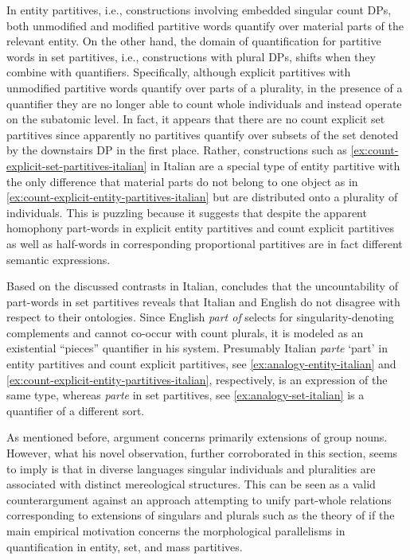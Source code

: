 In entity partitives, i.e., constructions involving embedded singular count DPs, both unmodified and modified partitive words quantify over material parts of the relevant entity. On the other hand, the domain of quantification for partitive words in set partitives, i.e., constructions with plural DPs, shifts when they combine with quantifiers. Specifically, although explicit partitives with unmodified partitive words quantify over parts of a plurality, in the presence of a quantifier they are no longer able to count whole individuals and instead operate on the subatomic level. In fact, it appears that there are no count explicit set partitives since apparently no partitives quantify over subsets of the set denoted by the downstairs DP in the first place. Rather, constructions such as \ref{ex:count-explicit-set-partitives-italian} in Italian are a special type of entity partitive with the only difference that material parts do not belong to one object as in \ref{ex:count-explicit-entity-partitives-italian} but are distributed onto a plurality of individuals. This is puzzling because it suggests that despite the apparent homophony part-words in explicit entity partitives and count explicit partitives as well as half-words in corresponding proportional partitives are in fact different semantic expressions.

Based on the discussed contrasts in Italian, \citet{schwarzschild1996pluralities} concludes that the uncountability of part-words in set partitives reveals that Italian and English do not disagree with respect to their ontologies. Since English \textit{part of} selects for singularity-denoting complements and cannot co-occur with count plurals, it is modeled as an existential ``pieces'' quantifier in his system. Presumably Italian \textit{parte} `part' in entity partitives and count explicit partitives, see \ref{ex:analogy-entity-italian} and \ref{ex:count-explicit-entity-partitives-italian}, respectively, is an expression of the same type, whereas \textit{parte} in set partitives, see \ref{ex:analogy-set-italian} is a quantifier of a different sort.

As mentioned before,  argument concerns primarily extensions of group nouns. However, what his novel observation, further corroborated in this section, seems to imply is that in diverse languages singular individuals and pluralities are associated with distinct mereological structures. This can be seen as a valid counterargument against an approach attempting to unify part-whole relations corresponding to extensions of singulars and plurals such as the theory of \citet{moltmann1997parts,moltmann1998part} if the main empirical motivation concerns the morphological parallelisms in quantification in entity, set, and mass partitives.

